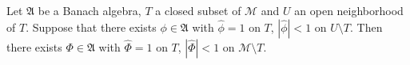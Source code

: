 
Let $\mathfrak{A}$ be a Banach algebra, $T$ a closed subset of $\mathcal{M}$ and $U$ an open neighborhood of $T$. Suppose that there exists $\phi \in \mathfrak{A}$ with $\hat{\phi} = 1$ on $T$, $|\hat{\phi}| < 1$ on $U \setminus T$. Then there exists $\Phi \in \mathfrak{A}$ with $\hat{\Phi} = 1$ on $T$, $|\hat{\Phi}| < 1$ on $\mathcal{M} \setminus T$.
